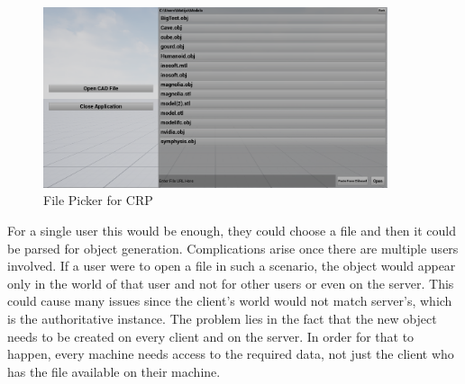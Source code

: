 \begin{figure}[htpb]
	\centering
	\includegraphics[width=0.9\textwidth]{fig/FilePicker2.png}
	\caption[CAD Runtime Presenter File Picker]{File Picker for CRP\protect}
	\label{fig:FilePicker}
\end{figure}

For a single user this would be enough, they could choose a file and then it could be parsed for object generation. Complications arise once there are multiple users involved. If a user were to open a file in such a scenario, the object would appear only in the world of that user and not for other users or even on the server. This could cause many issues since the client's world would not match server's, which is the authoritative instance. The problem lies in the fact that the new object needs to be created on every client and on the server. In order for that to happen, every machine needs access to the required data, not just the client who has the file available on their machine.\\

